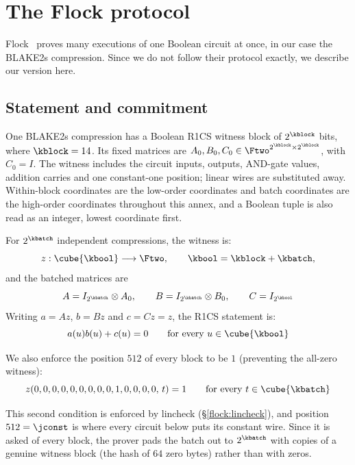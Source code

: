 \section{The Flock protocol}\label{annex:flock}

Flock~\cite{Flock26} proves many executions of one Boolean circuit at once, in our case the BLAKE2s compression. Since we do not follow their protocol exactly, we describe our version here.

\subsection{Statement and commitment}\label{flock:statement}

One BLAKE2s compression has a Boolean R1CS witness block of $2^{\kblock}$ bits, where $\kblock=14$. Its fixed matrices are $A_0,B_0,C_0\in\Ftwo^{2^{\kblock}\times 2^{\kblock}}$, with $C_0=I$. The witness includes the circuit inputs, outputs, AND-gate values, addition carries and one constant-one position; linear wires are substituted away. Within-block coordinates are the low-order coordinates and batch coordinates are the high-order coordinates throughout this annex, and a Boolean tuple is also read as an integer, lowest coordinate first.

For $2^{\kbatch}$ independent compressions, the witness is:
\[
z:\cube{\kbool}\longrightarrow\Ftwo,\qquad \kbool=\kblock+\kbatch,
\]
and the batched matrices are
\[
A=I_{2^{\kbatch}}\otimes A_0,\qquad B=I_{2^{\kbatch}}\otimes B_0,\qquad C=I_{2^{\kbool}}
\]
Writing $a=Az$, $b=Bz$ and $c=Cz=z$, the R1CS statement is:
\begin{equation}\label{flock:eq:r1cs}
a(u)b(u)+c(u)=0\qquad\text{for every }u\in\cube{\kbool}
\end{equation}

We also enforce the position $512$ of every block to be $1$ (preventing the all-zero witness):
\begin{equation}\label{flock:eq:const-one}
z(0,0,0,0,0,0,0,0,0,1,0,0,0,0,\,t)=1\qquad\text{for every }t\in\cube{\kbatch}
\end{equation}

This second condition is enforced by lincheck (\S\ref{flock:lincheck}), and position $512=\jconst$ is where every circuit below puts its constant wire. Since it is asked of every block, the prover pads the batch out to $2^{\kbatch}$ with copies of a genuine witness block (the hash of $64$ zero bytes) rather than with zeros.

